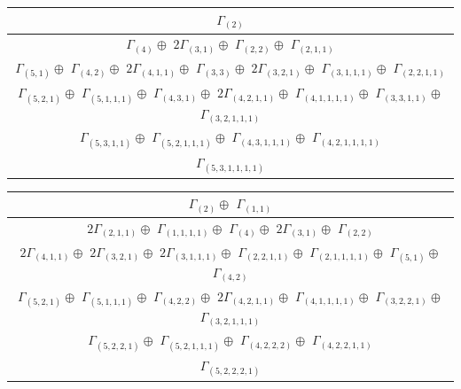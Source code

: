 \documentclass[main.tex]{subfiles}
\begin{document}
\bigskip
\begin{minipage}{1\textwidth}
\centering
\begin{tabular}{c}
$\Gamma_{(
2
)}$
\\ \hline
$\Gamma_{(
4
)} \oplus$
$ 2 \Gamma_{(
3 , 
1
)} \oplus$
$\Gamma_{(
2 , 
2
)} \oplus$
$\Gamma_{(
2 , 
1 , 
1
)}$
\\ \hline
$\Gamma_{(
5 , 
1
)} \oplus$
$\Gamma_{(
4 , 
2
)} \oplus$
$ 2 \Gamma_{(
4 , 
1 , 
1
)} \oplus$
$\Gamma_{(
3 , 
3
)} \oplus$
$ 2 \Gamma_{(
3 , 
2 , 
1
)} \oplus$
$\Gamma_{(
3 , 
1 , 
1 , 
1
)} \oplus$
$\Gamma_{(
2 , 
2 , 
1 , 
1
)}$
\\ \hline
$\Gamma_{(
5 , 
2 , 
1
)} \oplus$
$\Gamma_{(
5 , 
1 , 
1 , 
1
)} \oplus$
$\Gamma_{(
4 , 
3 , 
1
)} \oplus$
$ 2 \Gamma_{(
4 , 
2 , 
1 , 
1
)} \oplus$
$\Gamma_{(
4 , 
1 , 
1 , 
1 , 
1
)} \oplus$
$\Gamma_{(
3 , 
3 , 
1 , 
1
)} \oplus$
$\Gamma_{(
3 , 
2 , 
1 , 
1 , 
1
)}$
\\ \hline
$\Gamma_{(
5 , 
3 , 
1 , 
1
)} \oplus$
$\Gamma_{(
5 , 
2 , 
1 , 
1 , 
1
)} \oplus$
$\Gamma_{(
4 , 
3 , 
1 , 
1 , 
1
)} \oplus$
$\Gamma_{(
4 , 
2 , 
1 , 
1 , 
1 , 
1
)}$
\\ \hline
$\Gamma_{(
5 , 
3 , 
1 , 
1 , 
1 , 
1
)}$
\\
\end{tabular}\end{minipage}
\bigskip
\begin{minipage}{1\textwidth}
\centering
\begin{tabular}{c}
$\Gamma_{(
2
)} \oplus$
$\Gamma_{(
1 , 
1
)}$
\\ \hline
$ 2 \Gamma_{(
2 , 
1 , 
1
)} \oplus$
$\Gamma_{(
1 , 
1 , 
1 , 
1
)} \oplus$
$\Gamma_{(
4
)} \oplus$
$ 2 \Gamma_{(
3 , 
1
)} \oplus$
$\Gamma_{(
2 , 
2
)}$
\\ \hline
$ 2 \Gamma_{(
4 , 
1 , 
1
)} \oplus$
$ 2 \Gamma_{(
3 , 
2 , 
1
)} \oplus$
$ 2 \Gamma_{(
3 , 
1 , 
1 , 
1
)} \oplus$
$\Gamma_{(
2 , 
2 , 
1 , 
1
)} \oplus$
$\Gamma_{(
2 , 
1 , 
1 , 
1 , 
1
)} \oplus$
$\Gamma_{(
5 , 
1
)} \oplus$
$\Gamma_{(
4 , 
2
)}$
\\ \hline
$\Gamma_{(
5 , 
2 , 
1
)} \oplus$
$\Gamma_{(
5 , 
1 , 
1 , 
1
)} \oplus$
$\Gamma_{(
4 , 
2 , 
2
)} \oplus$
$ 2 \Gamma_{(
4 , 
2 , 
1 , 
1
)} \oplus$
$\Gamma_{(
4 , 
1 , 
1 , 
1 , 
1
)} \oplus$
$\Gamma_{(
3 , 
2 , 
2 , 
1
)} \oplus$
$\Gamma_{(
3 , 
2 , 
1 , 
1 , 
1
)}$
\\ \hline
$\Gamma_{(
5 , 
2 , 
2 , 
1
)} \oplus$
$\Gamma_{(
5 , 
2 , 
1 , 
1 , 
1
)} \oplus$
$\Gamma_{(
4 , 
2 , 
2 , 
2
)} \oplus$
$\Gamma_{(
4 , 
2 , 
2 , 
1 , 
1
)}$
\\ \hline
$\Gamma_{(
5 , 
2 , 
2 , 
2 , 
1
)}$
\\
\end{tabular}\end{minipage}
\end{document}
